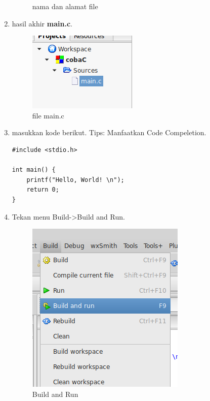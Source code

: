 \documentclass[12pt,]{article}
\begin{document}
\begin{enumerate}
\begin{figure}[H]
			\caption{nama dan alamat file}
		\end{figure}
	    \newpage
		\item hasil akhir \textbf{main.c}.
		\begin{figure}[H]
			\centering
			\includegraphics[width=0.4\linewidth]{images/c_cb_8}
			\caption{file main.c}
		\end{figure}
	
		\item masukkan kode berikut.
		Tips: Manfaatkan Code Compeletion.
		\begin{verbatim}
#include <stdio.h>

int main() {
	printf("Hello, World! \n");
	return 0;
}
		\end{verbatim}
		\item Tekan menu Build->Build and Run.
		\begin{figure}[H]
			\centering
			\includegraphics[width=0.4\linewidth]{images/c_cb_9}
			\caption{Build and Run}
		\end{figure}
			
	\end{enumerate}
\end{document}
